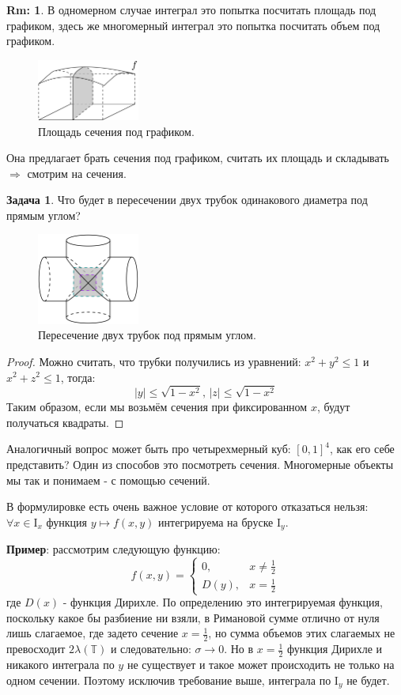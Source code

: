 \documentclass[12pt]{article}
\newcommand{\MTB}{\mathbb{T}}
\newcommand{\MI}{\mathrm{I}}
\theoremstyle{definition}
\newtheorem{rem}{Rm:}
\newtheorem{problem}{Задача}
\begin{document}
\begin{rem}
	В одномерном случае интеграл это попытка посчитать площадь под графиком, здесь же многомерный интеграл это попытка посчитать объем под графиком.
	\begin{figure}[H]
		\centering
		\includegraphics[width=0.3\textwidth]{MA4L2_4.png}
		\caption{Площадь сечения под графиком.}
		\label{MA4L2_4}
	\end{figure}
	Она предлагает брать сечения под графиком, считать их площадь и складывать $\Rightarrow$ смотрим на сечения.
\end{rem}
\begin{problem}
	Что будет в пересечении двух трубок одинакового диаметра под прямым углом?
	\begin{figure}[H]
		\centering
		\includegraphics[width=0.3\textwidth]{MA4L2_5.png}
		\caption{Пересечение двух трубок под прямым углом.}
		\label{MA4L2_5}
	\end{figure}
\end{problem}
\begin{proof}
	Можно считать, что трубки получились из уравнений: $x^2 + y^2 \leq 1$ и $x^2 + z^2 \leq 1$, тогда:
	$$
		|y| \leq \sqrt{1 - x^2} ,\, |z| \leq \sqrt{1 - x^2}
	$$
	Таким образом, если мы возьмём сечения при фиксированном $x$, будут получаться квадраты.
\end{proof}
Аналогичный вопрос может быть про четырехмерный куб: $[0,1]^4$, как его себе представить? Один из способов это посмотреть сечения. Многомерные объекты мы так и понимаем - с помощью сечений.

В формулировке есть очень важное условие от которого отказаться нельзя: $\forall x \in \MI_x$ функция $y \mapsto f(x,y)$ интегрируема на бруске $\MI_y$. 

\textbf{Пример}: рассмотрим следующую функцию:
$$
	f(x,y) = 
	\begin{cases}
		0, & x \neq \tfrac{1}{2}\\
		D(y), & x = \tfrac{1}{2}
	\end{cases}
$$
где $D(x)$ - функция Дирихле. По определению это интегрируемая функция, поскольку какое бы разбиение ни взяли, в Римановой сумме отлично от нуля лишь слагаемое, где задето сечение $x = \tfrac{1}{2}$, но сумма объемов этих слагаемых не превосходит $2 \lambda(\MTB)$ и следовательно: $\sigma \to 0$. Но в $x = \tfrac{1}{2}$ функция Дирихле и никакого интеграла по $y$ не существует и такое может происходить не только на одном сечении. Поэтому исключив требование выше, интеграла по $\MI_y$ не будет.
\end{document}
